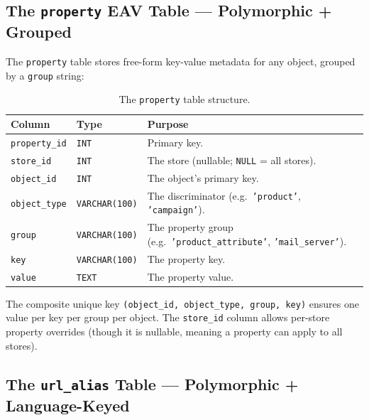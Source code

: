 \documentclass[11pt,a4paper]{article}
\begin{document}
\subsection{The \texttt{property} EAV Table --- Polymorphic + Grouped}

The \texttt{property} table stores free-form key-value metadata for any
object, grouped by a \texttt{group} string:

\begin{table}[htbp]
\centering
\caption{The \texttt{property} table structure.}\label{tab:property}
\small
\begin{tabularx}{\columnwidth}{llX}
\toprule
\textbf{Column} & \textbf{Type} & \textbf{Purpose} \\
\midrule
\texttt{property\_id} & \texttt{INT} & Primary key. \\
\texttt{store\_id}    & \texttt{INT} & The store (nullable; \texttt{NULL} = all stores). \\
\texttt{object\_id}   & \texttt{INT} & The object's primary key. \\
\texttt{object\_type} & \texttt{VARCHAR(100)} & The discriminator (e.g.\ \texttt{'product'}, \texttt{'campaign'}). \\
\texttt{group}        & \texttt{VARCHAR(100)} & The property group (e.g.\ \texttt{'product\_attribute'}, \texttt{'mail\_server'}). \\
\texttt{key}          & \texttt{VARCHAR(100)} & The property key. \\
\texttt{value}        & \texttt{TEXT} & The property value. \\
\bottomrule
\end{tabularx}
\end{table}

The composite unique key \texttt{(object\_id, object\_type, group,
key)} ensures one value per key per group per object. The
\texttt{store\_id} column allows per-store property overrides (though
it is nullable, meaning a property can apply to all stores).

\subsection{The \texttt{url\_alias} Table --- Polymorphic + Language-Keyed}
\end{document}
